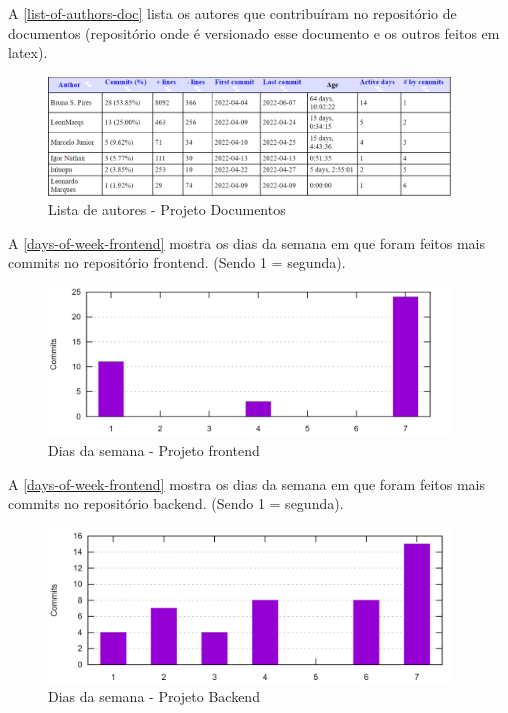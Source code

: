 A \autoref{list-of-authors-doc} lista os autores que contribuíram no repositório de documentos (repositório onde é versionado esse documento e os outros feitos em latex).
\begin{figure}[H]
	\centering
	\caption{\label{list-of-authors-doc}Lista de autores - Projeto Documentos}
	\includegraphics[width=0.95\textwidth]{../imagens/stats/list-of-authors-documentos.png}
\end{figure}

A \autoref{days-of-week-frontend} mostra os dias da semana em que foram feitos mais commits no repositório \gls{frontend}. (Sendo 1 = segunda).
\begin{figure}[H]
	\centering
	\caption{\label{days-of-week-frontend}Dias da semana - Projeto \gls{frontend}}
	\includegraphics[width=0.95\textwidth]{../imagens/stats/days-of-week-frontend.png}
\end{figure}

A \autoref{days-of-week-frontend} mostra os dias da semana em que foram feitos mais commits no repositório backend. (Sendo 1 = segunda).
\begin{figure}[H]
	\centering
	\caption{\label{days-of-week-backend}Dias da semana - Projeto Backend}
	\includegraphics[width=0.95\textwidth]{../imagens/stats/days-of-week-backend.png}
\end{figure}